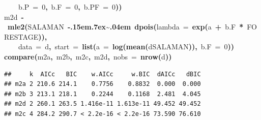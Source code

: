 \documentclass{article}
\makeatletter
\newcommand{\hlnumber}[1]{\textcolor[rgb]{0,0,0}{#1}}%
\newcommand{\hlfunctioncall}[1]{\textcolor[rgb]{.5,0,.33}{\textbf{#1}}}%
\newcommand{\hlkeyword}[1]{\textbf{#1}}%
\newcommand{\hlargument}[1]{\textcolor[rgb]{.69,.25,.02}{#1}}%
\newcommand{\hlassignement}[1]{\textbf{#1}}%
\newcommand{\hlsymbol}[1]{#1}%
\def\urltilda{\kern -.15em\lower .7ex\hbox{\~{}}\kern .04em}%
\newcommand{\hlstd}[1]{\textcolor[rgb]{0,0,0}{#1}}%
\newenvironment{kframe}{%
 \def\FrameCommand##1{\hskip\@totalleftmargin \hskip-\fboxsep
 \colorbox{shadecolor}{##1}\hskip-\fboxsep
     \hskip-\linewidth \hskip-\@totalleftmargin \hskip\columnwidth}%
 \MakeFramed {\advance\hsize-\width
   \@totalleftmargin\z@ \linewidth\hsize
   \@setminipage}}%
 {\par\unskip\endMakeFramed}
\newenvironment{knitrout}{}{} %
\makeatother
\begin{document}
\begin{knitrout}
{\begin{kframe}
\begin{flushleft}
\hlstd{}{\ }{\ }{\ }{\ }\hlargument{b.P}{\ }\hlargument{=}{\ }\hlnumber{0}\hlkeyword{,}{\ }\hlargument{b.F}{\ }\hlargument{=}{\ }\hlnumber{0}\hlkeyword{,}{\ }\hlargument{b.PF}{\ }\hlargument{=}{\ }\hlnumber{0}\hlkeyword{)}\hlkeyword{)}\hspace*{\fill}\\
\hlstd{}\hlsymbol{m2d}{\ }\hlassignement{\usebox{\hlnormalsizeboxlessthan}-}{\ }\hlfunctioncall{mle2}\hlkeyword{(}\hlsymbol{SALAMAN}{\ }\hlkeyword{\urltilda{}}{\ }\hlfunctioncall{dpois}\hlkeyword{(}\hlargument{lambda}{\ }\hlargument{=}{\ }\hlfunctioncall{exp}\hlkeyword{(}\hlsymbol{a}{\ }\hlkeyword{+}{\ }\hlsymbol{b.F}{\ }\hlkeyword{*}{\ }\hlsymbol{FORESTAGE}\hlkeyword{)}\hlkeyword{)}\hlkeyword{,}\hspace*{\fill}\\
\hlstd{}{\ }{\ }{\ }{\ }\hlargument{data}{\ }\hlargument{=}{\ }\hlsymbol{d}\hlkeyword{,}{\ }\hlargument{start}{\ }\hlargument{=}{\ }\hlfunctioncall{list}\hlkeyword{(}\hlargument{a}{\ }\hlargument{=}{\ }\hlfunctioncall{log}\hlkeyword{(}\hlfunctioncall{mean}\hlkeyword{(}\hlsymbol{d}\hlkeyword{\usebox{\hlnormalsizeboxdollar}}\hlsymbol{SALAMAN}\hlkeyword{)}\hlkeyword{)}\hlkeyword{,}{\ }\hlargument{b.F}{\ }\hlargument{=}{\ }\hlnumber{0}\hlkeyword{)}\hlkeyword{)}\hspace*{\fill}\\
\hlstd{}\hlfunctioncall{compare}\hlkeyword{(}\hlsymbol{m2a}\hlkeyword{,}{\ }\hlsymbol{m2b}\hlkeyword{,}{\ }\hlsymbol{m2c}\hlkeyword{,}{\ }\hlsymbol{m2d}\hlkeyword{,}{\ }\hlargument{nobs}{\ }\hlargument{=}{\ }\hlfunctioncall{nrow}\hlkeyword{(}\hlsymbol{d}\hlkeyword{)}\hlkeyword{)}\mbox{}
\normalfont
\end{flushleft}
\begin{verbatim}
##     k  AICc   BIC    w.AICc     w.BIC  dAICc   dBIC
## m2a 2 210.6 214.1    0.7756    0.8832  0.000  0.000
## m2b 3 213.1 218.1    0.2244    0.1168  2.481  4.045
## m2d 2 260.1 263.5 1.416e-11 1.613e-11 49.452 49.452
## m2c 4 284.2 290.7 < 2.2e-16 < 2.2e-16 73.590 76.610
\end{verbatim}
\end{kframe}}
\end{knitrout}
\end{document}
